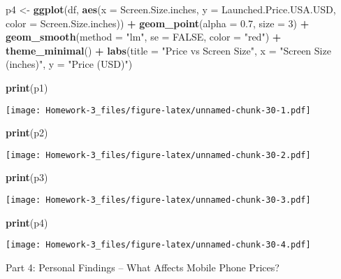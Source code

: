 \documentclass[
]{article}
\newenvironment{Shaded}{\begin{snugshade}}{\end{snugshade}}
\newcommand{\AttributeTok}[1]{\textcolor[rgb]{0.13,0.29,0.53}{#1}}
\newcommand{\ConstantTok}[1]{\textcolor[rgb]{0.56,0.35,0.01}{#1}}
\newcommand{\DecValTok}[1]{\textcolor[rgb]{0.00,0.00,0.81}{#1}}
\newcommand{\FloatTok}[1]{\textcolor[rgb]{0.00,0.00,0.81}{#1}}
\newcommand{\FunctionTok}[1]{\textcolor[rgb]{0.13,0.29,0.53}{\textbf{#1}}}
\newcommand{\NormalTok}[1]{#1}
\newcommand{\OtherTok}[1]{\textcolor[rgb]{0.56,0.35,0.01}{#1}}
\newcommand{\SpecialCharTok}[1]{\textcolor[rgb]{0.81,0.36,0.00}{\textbf{#1}}}
\newcommand{\StringTok}[1]{\textcolor[rgb]{0.31,0.60,0.02}{#1}}
\begin{document}
\begin{Shaded}
\begin{Highlighting}[]
\NormalTok{p4 }\OtherTok{\textless{}{-}} \FunctionTok{ggplot}\NormalTok{(df, }\FunctionTok{aes}\NormalTok{(}\AttributeTok{x =}\NormalTok{ Screen.Size.inches, }\AttributeTok{y =}\NormalTok{ Launched.Price.USA.USD, }\AttributeTok{color =}\NormalTok{ Screen.Size.inches)) }\SpecialCharTok{+}
  \FunctionTok{geom\_point}\NormalTok{(}\AttributeTok{alpha =} \FloatTok{0.7}\NormalTok{, }\AttributeTok{size =} \DecValTok{3}\NormalTok{) }\SpecialCharTok{+}
  \FunctionTok{geom\_smooth}\NormalTok{(}\AttributeTok{method =} \StringTok{"lm"}\NormalTok{, }\AttributeTok{se =} \ConstantTok{FALSE}\NormalTok{, }\AttributeTok{color =} \StringTok{"red"}\NormalTok{) }\SpecialCharTok{+}
  \FunctionTok{theme\_minimal}\NormalTok{() }\SpecialCharTok{+}
  \FunctionTok{labs}\NormalTok{(}\AttributeTok{title =} \StringTok{"Price vs Screen Size"}\NormalTok{, }\AttributeTok{x =} \StringTok{"Screen Size (inches)"}\NormalTok{, }\AttributeTok{y =} \StringTok{"Price (USD)"}\NormalTok{)}

\FunctionTok{print}\NormalTok{(p1)}
\end{Highlighting}
\end{Shaded}

\texttt{[image: Homework-3\_files/figure-latex/unnamed-chunk-30-1.pdf]}

\begin{Shaded}
\begin{Highlighting}[]
\FunctionTok{print}\NormalTok{(p2)}
\end{Highlighting}
\end{Shaded}

\texttt{[image: Homework-3\_files/figure-latex/unnamed-chunk-30-2.pdf]}

\begin{Shaded}
\begin{Highlighting}[]
\FunctionTok{print}\NormalTok{(p3)}
\end{Highlighting}
\end{Shaded}

\texttt{[image: Homework-3\_files/figure-latex/unnamed-chunk-30-3.pdf]}

\begin{Shaded}
\begin{Highlighting}[]
\FunctionTok{print}\NormalTok{(p4)}
\end{Highlighting}
\end{Shaded}

\texttt{[image: Homework-3\_files/figure-latex/unnamed-chunk-30-4.pdf]}

Part 4: Personal Findings -- What Affects Mobile Phone Prices?
\end{document}
